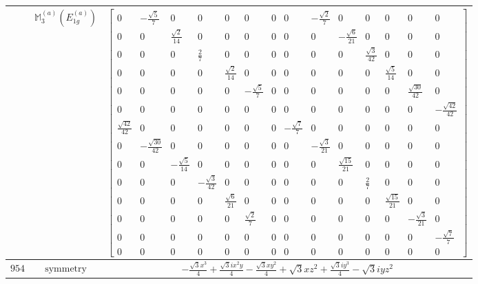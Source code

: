 \documentclass[fleqn,8pt,landscape]{jsarticle}
\begin{document}
\begin{longtable}{ccc}
$  $ & $ \mathbb{M}_{3}^{(a)}(E_{1g}^{(a)}) $ & $ \begin{bmatrix} 0 & - \frac{\sqrt{5}}{7} & 0 & 0 & 0 & 0 & 0 & 0 & - \frac{\sqrt{2}}{7} & 0 & 0 & 0 & 0 & 0 \\ 0 & 0 & \frac{\sqrt{2}}{14} & 0 & 0 & 0 & 0 & 0 & 0 & - \frac{\sqrt{6}}{21} & 0 & 0 & 0 & 0 \\ 0 & 0 & 0 & \frac{2}{7} & 0 & 0 & 0 & 0 & 0 & 0 & \frac{\sqrt{3}}{42} & 0 & 0 & 0 \\ 0 & 0 & 0 & 0 & \frac{\sqrt{2}}{14} & 0 & 0 & 0 & 0 & 0 & 0 & \frac{\sqrt{5}}{14} & 0 & 0 \\ 0 & 0 & 0 & 0 & 0 & - \frac{\sqrt{5}}{7} & 0 & 0 & 0 & 0 & 0 & 0 & \frac{\sqrt{30}}{42} & 0 \\ 0 & 0 & 0 & 0 & 0 & 0 & 0 & 0 & 0 & 0 & 0 & 0 & 0 & - \frac{\sqrt{42}}{42} \\ \frac{\sqrt{42}}{42} & 0 & 0 & 0 & 0 & 0 & 0 & - \frac{\sqrt{7}}{7} & 0 & 0 & 0 & 0 & 0 & 0 \\ 0 & - \frac{\sqrt{30}}{42} & 0 & 0 & 0 & 0 & 0 & 0 & - \frac{\sqrt{3}}{21} & 0 & 0 & 0 & 0 & 0 \\ 0 & 0 & - \frac{\sqrt{5}}{14} & 0 & 0 & 0 & 0 & 0 & 0 & \frac{\sqrt{15}}{21} & 0 & 0 & 0 & 0 \\ 0 & 0 & 0 & - \frac{\sqrt{3}}{42} & 0 & 0 & 0 & 0 & 0 & 0 & \frac{2}{7} & 0 & 0 & 0 \\ 0 & 0 & 0 & 0 & \frac{\sqrt{6}}{21} & 0 & 0 & 0 & 0 & 0 & 0 & \frac{\sqrt{15}}{21} & 0 & 0 \\ 0 & 0 & 0 & 0 & 0 & \frac{\sqrt{2}}{7} & 0 & 0 & 0 & 0 & 0 & 0 & - \frac{\sqrt{3}}{21} & 0 \\ 0 & 0 & 0 & 0 & 0 & 0 & 0 & 0 & 0 & 0 & 0 & 0 & 0 & - \frac{\sqrt{7}}{7} \\ 0 & 0 & 0 & 0 & 0 & 0 & 0 & 0 & 0 & 0 & 0 & 0 & 0 & 0 \end{bmatrix} $ \\ \hline
$ 954 $ & $ \text{symmetry} $ & $ - \frac{\sqrt{3} x^{3}}{4} + \frac{\sqrt{3} i x^{2} y}{4} - \frac{\sqrt{3} x y^{2}}{4} + \sqrt{3} x z^{2} + \frac{\sqrt{3} i y^{3}}{4} - \sqrt{3} i y z^{2} $ \\

\end{longtable}
\end{document}
